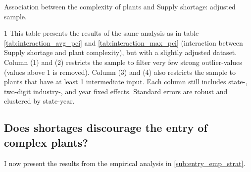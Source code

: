 \documentclass[11pt]{article}
\begin{document}
\begin{table} 
	\begin{center}
		\begin{threeparttable}
			\caption{Association between the complexity of plants and Supply shortage: adjusted sample.}
			\label{tab:filtered_input}
			
			\begin{tablenotes} \footnotesize 
			\item[1] This table presents the results of the same analysis as in table \ref{tab:interaction_avg_pci} and \ref{tab:interaction_max_pci} (interaction between Supply shortage and plant complexity), but with a slightly adjusted dataset. Column (1) and (2) restricts the sample to filter very few strong outlier-values (values above 1 is removed). Column (3) and (4) also restricts the sample to plants that have at least 1 intermediate input. Each column still includes state-, two-digit industry-, and year fixed effects. Standard errors are robust and clustered by state-year.
			\end{tablenotes}
		\end{threeparttable}
	\end{center}
\end{table}   

\subsection{Does shortages discourage the entry of complex plants?}
\label{sub:longterm}
I now present the results from the empirical analysis in \ref{sub:entry_emp_strat}.
\end{document}

